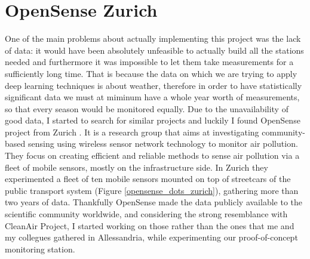 \documentclass[11pt,a4paper,titlepage]{book}
\begin{document}
\section{OpenSense Zurich}
\label{opensense:intro}
One of the main problems about actually implementing this project was the lack of data: it would have been absolutely unfeasible to actually build all the stations needed and furthermore it was impossible to let them take measurements for a sufficiently long time.
\newline
That is because the data on which we are trying to apply deep learning techniques is about weather, therefore in order to have statistically significant data we must at miminum have a whole year worth of measurements, so that every season would be monitored equally.
\newline
\newline
Due to the unavailability of good data, I started to search for similar projects and luckily I found OpenSense project from Zurich \cite{opensense}. It is a research group that aims at investigating community-based sensing using wireless sensor network technology to monitor air pollution.
\newline
They focus on creating efficient and reliable methods to sense air pollution via a fleet of mobile sensors, mostly on the infrastructure side. In Zurich they experimented a fleet of ten mobile sensors mounted on top of streetcars of the public transport system (Figure \ref{opensense_dots_zurich}), gathering more than two years of data.
\newline
\newline
Thankfully OpenSense made the data publicly available to the scientific community worldwide, and considering the strong resemblance with CleanAir Project, I started working on those rather than the ones that me and my collegues gathered in Allessandria, while experimenting our proof-of-concept monitoring station.
\end{document}

